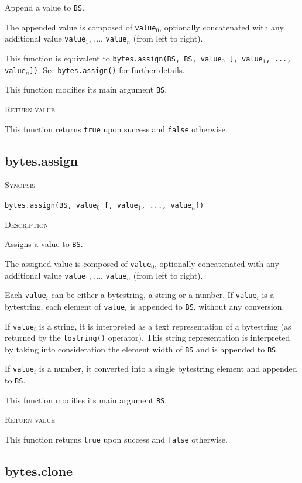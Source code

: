 \documentclass[11pt]{report}
\newcommand{\mansection}[1]{\vspace{0.5em}\par\noindent\textsc{#1}\vspace{0.5em}\par}
\newcommand{\syn}[1]{\texttt{#1}}
\begin{document}
Append a value to \syn{BS}.

The appended value is composed of \syn{value$_0$}, optionally concatenated with
any additional value \syn{value$_1$}, ..., \syn{value$_n$} (from left to right).

This function is equivalent to 
\syn{bytes.assign(BS, BS, \syn{value$_0$} [, \syn{value$_1$}, ..., \syn{value$_n$}])}.
See \syn{bytes.assign()} for further details.

This function modifies its main argument \syn{BS}.

\mansection{Return value}

This function returns \syn{true} upon success and \syn{false} otherwise.

\subsection{bytes.assign}

\mansection{Synopsis}
\syn{bytes.assign(BS, \syn{value$_0$} [, \syn{value$_1$}, ..., \syn{value$_n$}])}

\mansection{Description}

  Assigns a value to \syn{BS}. 

  The assigned value is composed of \syn{value$_0$}, optionally concatenated with 
  any additional value \syn{value$_1$}, ..., \syn{value$_n$} (from left to right).

  Each \syn{value$_i$} can be either a bytestring, a string or a number.
  If \syn{value$_i$} is a bytestring, each element of \syn{value$_i$} is appended to \syn{BS}, 
  without any conversion.

  If \syn{value$_i$} is a string, it is interpreted as a text representation of
  a bytestring (as returned by the \syn{tostring()} operator). This string
  representation is interpreted by taking into consideration the element width 
  of \syn{BS} and is appended to \syn{BS}.

  If \syn{value$_i$} is a number, it converted into a single bytestring element and 
  appended to \syn{BS}.

  This function modifies its main argument \syn{BS}.

\mansection{Return value}

  This function returns \syn{true} upon success and \syn{false} otherwise.

\subsection{bytes.clone}
\end{document}
